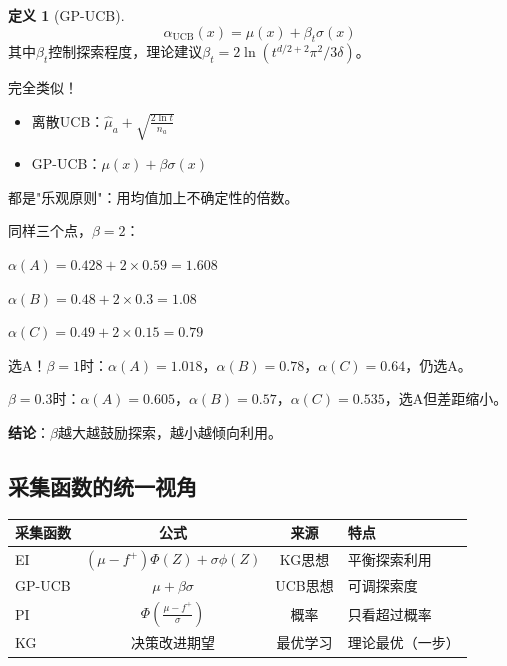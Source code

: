 \documentclass[11pt,a4paper]{article}
\theoremstyle{definition}
\newtheorem{definition}{定义}[section]
\begin{document}
\begin{definition}[GP-UCB]
\[
\alpha_{\text{UCB}}(x) = \mu(x) + \beta_t \sigma(x)
\]
其中$\beta_t$控制探索程度，理论建议$\beta_t = 2\ln(t^{d/2+2}\pi^2/3\delta)$。
\end{definition}

\begin{plainwords}
完全类似！
\begin{itemize}
    \item 离散UCB：$\hat{\mu}_a + \sqrt{\frac{2\ln t}{n_a}}$
    \item GP-UCB：$\mu(x) + \beta \sigma(x)$
\end{itemize}

都是"乐观原则"：用均值加上不确定性的倍数。
\end{plainwords}

\begin{calculation}
同样三个点，$\beta = 2$：

$\alpha(A) = 0.428 + 2 \times 0.59 = 1.608$

$\alpha(B) = 0.48 + 2 \times 0.3 = 1.08$

$\alpha(C) = 0.49 + 2 \times 0.15 = 0.79$

选A！$\beta = 1$时：$\alpha(A) = 1.018$，$\alpha(B) = 0.78$，$\alpha(C) = 0.64$，仍选A。

$\beta = 0.3$时：$\alpha(A) = 0.605$，$\alpha(B) = 0.57$，$\alpha(C) = 0.535$，选A但差距缩小。

\textbf{结论}：$\beta$越大越鼓励探索，越小越倾向利用。
\end{calculation}

\subsection{采集函数的统一视角}

\begin{center}
\begin{tabular}{l|c|c|l}
\toprule
采集函数 & 公式 & 来源 & 特点 \\
\midrule
EI & $(\mu-f^+)\Phi(Z) + \sigma\phi(Z)$ & KG思想 & 平衡探索利用 \\
GP-UCB & $\mu + \beta\sigma$ & UCB思想 & 可调探索度 \\
PI & $\Phi\left(\frac{\mu - f^+}{\sigma}\right)$ & 概率 & 只看超过概率 \\
KG & 决策改进期望 & 最优学习 & 理论最优（一步） \\
\bottomrule
\end{tabular}
\end{center}
\end{document}
